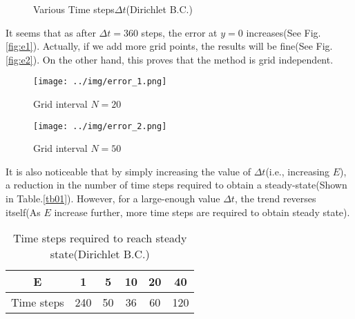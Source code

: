 \begin{figure}[htbp]
\centering
{}%
%
\caption{Various Time steps$\Delta t$(Dirichlet B.C.)}
\end{figure}


It seems that as after $\Delta t=360$ steps, the error at $y=0$ increases(See Fig.\eqref{fig:e1}). Actually, if we add more grid points, the results will be fine(See Fig.\eqref{fig:e2}). On the other hand, this proves that the method is grid independent.
\begin{figure}
\small
\centering
\texttt{[image: ../img/error\_1.png]}
\caption{Grid interval $N=20$} \label{fig:e1}
\end{figure}
\begin{figure}
\small
\centering
\texttt{[image: ../img/error\_2.png]}
\caption{Grid interval $N=50$} \label{fig:e2}
\end{figure}


It is also noticeable that by simply increasing the value of $\Delta t$(i.e., increasing $E$), a reduction in the number of time steps required to obtain a steady-state(Shown in Table.\eqref{tb01}). However, for a large-enough value $\Delta t$, the trend reverses itself(As $E$ increase further, more time steps are required to obtain steady state).

\begin{table}[htbp]
\centering
\caption{Time steps required to reach steady state(Dirichlet B.C.)}
\begin{tabular}{|c|c|c|c|c|c|}
  \hline
     E         &  1  & 5  & 10 & 20 & 40 \\
  \hline
  Time steps   & 240 & 50 & 36 & 60 & 120\\
  \hline
\end{tabular} \label{tb01}
\end{table}

